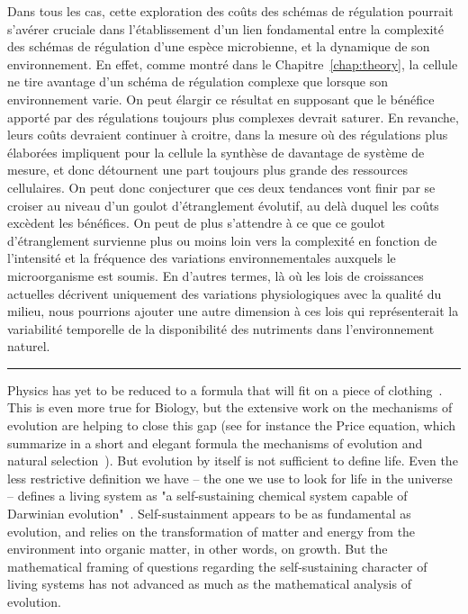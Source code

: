 Dans tous les cas, cette exploration des coûts des schémas de régulation pourrait s'avérer cruciale dans l'établissement d'un lien fondamental entre la complexité des schémas de régulation d'une espèce microbienne, et la dynamique de son environnement.
En effet, comme montré dans le Chapitre~\ref{chap:theory}, la cellule ne tire avantage d'un schéma de régulation complexe que lorsque son environnement varie.
On peut élargir ce résultat en supposant que le bénéfice apporté par des régulations toujours plus complexes devrait saturer.
En revanche, leurs coûts devraient continuer à croitre, dans la mesure où des régulations plus élaborées impliquent pour la cellule la synthèse de davantage de système de mesure, et donc détournent une part toujours plus grande des ressources cellulaires.
On peut donc conjecturer que ces deux tendances vont finir par se croiser au niveau d'un goulot d'étranglement évolutif, au delà duquel les coûts excèdent les bénéfices.
On peut de plus s'attendre à ce que ce goulot d'étranglement survienne plus ou moins loin vers la complexité en fonction de l'intensité et la fréquence des variations environnementales auxquels le microorganisme est soumis.
En d'autres termes, là où les lois de croissances actuelles décrivent uniquement des variations physiologiques avec la qualité du milieu, nous pourrions ajouter une autre dimension à ces lois qui représenterait la variabilité temporelle de la disponibilité des nutriments dans l'environnement naturel.

\begin{center}
\noindent\rule{4cm}{0.1pt}
\end{center}

Physics has yet to be reduced to a formula that will fit on a piece of clothing~\cite{falk_universe_2005}.
This is even more true for Biology, but the extensive work on the mechanisms of evolution are helping to close this gap (see for instance the Price equation, which summarize in a short and elegant formula the mechanisms of evolution and natural selection~\cite{frank_natural_2012}).
But evolution by itself is not sufficient to define life.
Even the less restrictive definition we have -- the one we use to look for life in the universe -- defines a living system as "a self-sustaining chemical system capable of Darwinian evolution"~\cite{deamer_origins_1994,benner_defining_2010}.
Self-sustainment appears to be as fundamental as evolution, and relies on the transformation of matter and energy from the environment into organic matter, in other words, on growth.
But the mathematical framing of questions regarding the self-sustaining character of living systems has not advanced as much as the mathematical analysis of evolution.

